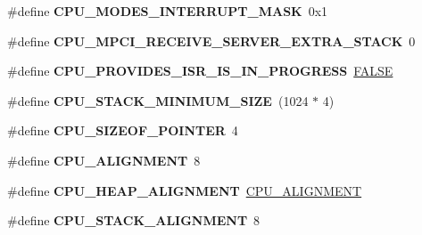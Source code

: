 \begin{DoxyCompactItemize}
\item 
\mbox{\label{group__RTEMSScoreCPUARM_gaf8823e651e33b9683e0d89e5a8054ee6}} 
\#define {\bfseries C\+P\+U\+\_\+\+M\+O\+D\+E\+S\+\_\+\+I\+N\+T\+E\+R\+R\+U\+P\+T\+\_\+\+M\+A\+SK}~0x1
\item 
\mbox{\label{group__RTEMSScoreCPUARM_gab94869be93a41da88a10fa59771ce2c9}} 
\#define {\bfseries C\+P\+U\+\_\+\+M\+P\+C\+I\+\_\+\+R\+E\+C\+E\+I\+V\+E\+\_\+\+S\+E\+R\+V\+E\+R\+\_\+\+E\+X\+T\+R\+A\+\_\+\+S\+T\+A\+CK}~0
\item 
\mbox{\label{group__RTEMSScoreCPUARM_ga47f6e4d60c72b5f65fc775b0b5dd14ec}} 
\#define {\bfseries C\+P\+U\+\_\+\+P\+R\+O\+V\+I\+D\+E\+S\+\_\+\+I\+S\+R\+\_\+\+I\+S\+\_\+\+I\+N\+\_\+\+P\+R\+O\+G\+R\+E\+SS}~\mbox{\hyperlink{group__RTEMSScoreBaseDefs_gaa93f0eb578d23995850d61f7d61c55c1}{F\+A\+L\+SE}}
\item 
\mbox{\label{group__RTEMSScoreCPUARM_ga4c92ceea7549cc7b21db2c466916b733}} 
\#define {\bfseries C\+P\+U\+\_\+\+S\+T\+A\+C\+K\+\_\+\+M\+I\+N\+I\+M\+U\+M\+\_\+\+S\+I\+ZE}~(1024 $\ast$ 4)
\item 
\mbox{\label{group__RTEMSScoreCPUARM_gaea4bd2905092d69bc92fbff6103ced8b}} 
\#define {\bfseries C\+P\+U\+\_\+\+S\+I\+Z\+E\+O\+F\+\_\+\+P\+O\+I\+N\+T\+ER}~4
\item 
\mbox{\label{group__RTEMSScoreCPUARM_gae526a309e32001688261048b19cdb7d8}} 
\#define {\bfseries C\+P\+U\+\_\+\+A\+L\+I\+G\+N\+M\+E\+NT}~8
\item 
\mbox{\label{group__RTEMSScoreCPUARM_gac71c1e0159c32144a04f18646ede252b}} 
\#define {\bfseries C\+P\+U\+\_\+\+H\+E\+A\+P\+\_\+\+A\+L\+I\+G\+N\+M\+E\+NT}~\mbox{\hyperlink{v850_2include_2rtems_2score_2cpu_8h_ae526a309e32001688261048b19cdb7d8}{C\+P\+U\+\_\+\+A\+L\+I\+G\+N\+M\+E\+NT}}
\item 
\mbox{\label{group__RTEMSScoreCPUARM_ga8aed43eb1b3c346772c127482b4b5372}} 
\#define {\bfseries C\+P\+U\+\_\+\+S\+T\+A\+C\+K\+\_\+\+A\+L\+I\+G\+N\+M\+E\+NT}~8
\item 

\end{DoxyCompactItemize}
